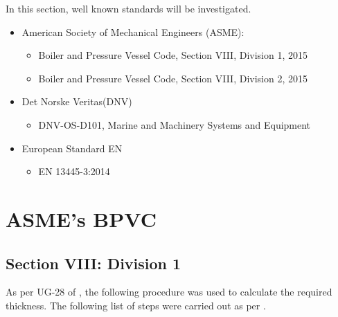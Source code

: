 \label{chapt:standards}

In this section, well known standards will be investigated.

\begin{itemize}
    \item American Society of Mechanical Engineers (ASME):
	    \begin{itemize}[label=$\bullet$]
	    	\item Boiler and Pressure Vessel Code, Section VIII, Division 1, 2015 \citep{ASMEbvpcVII1}
	    	\item Boiler and Pressure Vessel Code, Section VIII, Division 2, 2015 \citep{ASMEbvpcVII2}
	    \end{itemize}
	\item Det Norske Veritas(DNV) \citep{DNVOSD101}
		    \begin{itemize}[label=$\bullet$]
	    	\item DNV-OS-D101, Marine and Machinery Systems and Equipment\citep{ASMEbvpcVII1}
	    \end{itemize}
    \item European Standard EN
        \begin{itemize}[label=$\bullet$]
	       	\item EN 13445-3:2014 \citep{EN134453}
	    \end{itemize}
\end{itemize}

\section{ASME's BPVC}

\subsection{Section VIII: Division 1}
As per UG-28 of \citep{ASMEbvpcVII1}, the following procedure was used to calculate the required thickness.
The following list of steps were carried out as per \citep{ASMEbvpcVII1}.


